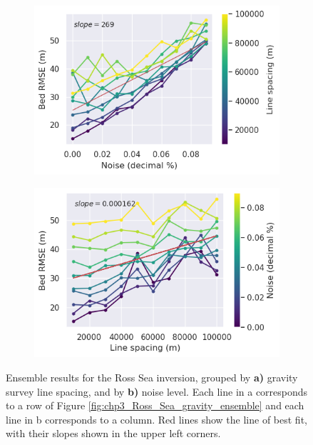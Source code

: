\begin{figure}[!ht]
  \centering
    \begin{subfigure}[t]{.48\textwidth}
        \centering
        \includegraphics[width=\textwidth]{figures/chp3/chp3_Ross_Sea_gravity_ensemble_noise_lines.png}
        \caption{}
    \end{subfigure}
    \begin{subfigure}[t]{.48\textwidth}
        \centering
        \includegraphics[width=\textwidth]{figures/chp3/chp3_Ross_Sea_gravity_ensemble_spacing_lines.png}
        \caption{}
    \end{subfigure}
  \caption[Grouped Ross Sea inversion with regional ensemble]{Ensemble results for the Ross Sea inversion, grouped by \textbf{a)} gravity survey line spacing, and by \textbf{b)} noise level. Each line in a corresponds to a row of Figure \ref{fig:chp3_Ross_Sea_gravity_ensemble} and each line in b corresponds to a column. Red lines show the line of best fit, with their slopes shown in the upper left corners.}
    \label{fig:chp3_Ross_Sea_gravity_ensemble_lines}
\end{figure}

